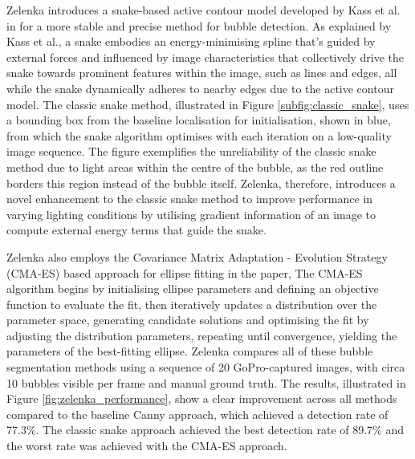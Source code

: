 Zelenka introduces a snake-based active contour model developed by Kass et al. in \cite{kassSnakesActiveContour1988} for a more stable and precise method for bubble detection. As explained by Kass et al., a snake embodies an energy-minimising spline that's guided by external forces and influenced by image characteristics that collectively drive the snake towards prominent features within the image, such as lines and edges, all while the snake dynamically adheres to nearby edges due to the active contour model. The classic snake method, illustrated in Figure \ref{subfig:classic_snake}, uses a bounding box from the baseline localisation for initialisation, shown in blue, from which the snake algorithm optimises with each iteration on a low-quality image sequence. The figure exemplifies the unreliability of the classic snake method due to light areas within the centre of the bubble, as the red outline borders this region instead of the bubble itself. Zelenka, therefore, introduces a novel enhancement to the classic snake method to improve performance in varying lighting conditions by utilising gradient information of an image to compute external energy terms that guide the snake.

Zelenka also employs the Covariance Matrix Adaptation - Evolution Strategy (CMA-ES) based approach for ellipse fitting in the paper, The CMA-ES algorithm begins by initialising ellipse parameters and defining an objective function to evaluate the fit, then iteratively updates a distribution over the parameter space, generating candidate solutions and optimising the fit by adjusting the distribution parameters, repeating until convergence, yielding the parameters of the best-fitting ellipse. Zelenka compares all of these bubble segmentation methods using a sequence of 20 GoPro-captured images, with circa 10 bubbles visible per frame and manual ground truth. The results, illustrated in Figure \ref{fig:zelenka_performance}, show a clear improvement across all methods compared to the baseline Canny approach, which achieved a detection rate of 77.3\%. The classic snake approach achieved the best detection rate of 89.7\% and the worst rate was achieved with the CMA-ES approach.

